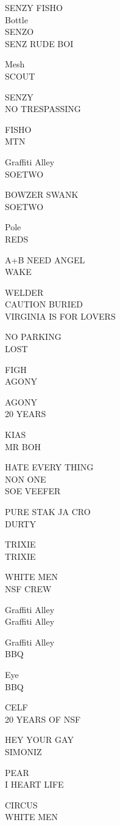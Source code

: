 \documentclass[10pt,letterpaper]{article}
\begin{document}
SENZY FISHO\\
Bottle\\
SENZO\\
SENZ RUDE BOI

Mesh\\
SCOUT

SENZY\\
NO TRESPASSING

FISHO\\
MTN

Graffiti Alley\\
SOETWO

BOWZER SWANK\\
SOETWO

Pole\\
REDS

A+B NEED ANGEL\\
WAKE

WELDER\\
CAUTION BURIED\\
VIRGINIA IS FOR LOVERS

NO PARKING\\
LOST

FIGH\\
AGONY

AGONY\\
20 YEARS

KIAS\\
MR BOH

HATE EVERY THING\\
NON ONE\\
SOE VEEFER

PURE STAK JA CRO\\
DURTY

TRIXIE\\
TRIXIE

WHITE MEN\\
NSF CREW

Graffiti Alley\\
Graffiti Alley

Graffiti Alley\\
BBQ

Eye\\
BBQ

CELF\\
20 YEARS OF NSF

HEY YOUR GAY\\
SIMONIZ

PEAR\\
I HEART LIFE

CIRCUS\\
WHITE MEN
\end{document}

